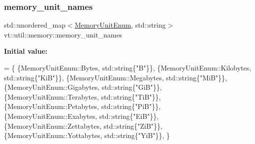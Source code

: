 \subsubsection{\texorpdfstring{memory\+\_\+unit\+\_\+names}{memory\_unit\_names}}
{\footnotesize\ttfamily std\+::unordered\+\_\+map$<$\hyperlink{namespacevt_1_1util_1_1memory_a64df3d84293b34009f78e2a1db2f9bb6}{Memory\+Unit\+Enum}, std\+::string$>$ vt\+::util\+::memory\+::memory\+\_\+unit\+\_\+names}

{\bfseries Initial value\+:}
\begin{DoxyCode}
= \{
  \{MemoryUnitEnum::Bytes,      std::string\{\textcolor{stringliteral}{"B"}\}\},
  \{MemoryUnitEnum::Kilobytes,  std::string\{\textcolor{stringliteral}{"KiB"}\}\},
  \{MemoryUnitEnum::Megabytes,  std::string\{\textcolor{stringliteral}{"MiB"}\}\},
  \{MemoryUnitEnum::Gigabytes,  std::string\{\textcolor{stringliteral}{"GiB"}\}\},
  \{MemoryUnitEnum::Terabytes,  std::string\{\textcolor{stringliteral}{"TiB"}\}\},
  \{MemoryUnitEnum::Petabytes,  std::string\{\textcolor{stringliteral}{"PiB"}\}\},
  \{MemoryUnitEnum::Exabytes,   std::string\{\textcolor{stringliteral}{"EiB"}\}\},
  \{MemoryUnitEnum::Zettabytes, std::string\{\textcolor{stringliteral}{"ZiB"}\}\},
  \{MemoryUnitEnum::Yottabytes, std::string\{\textcolor{stringliteral}{"YiB"}\}\},
\}
\end{DoxyCode}
